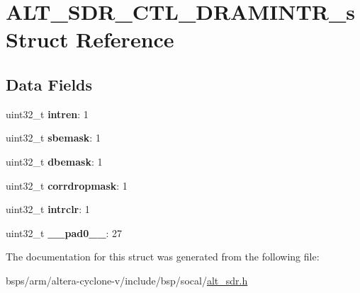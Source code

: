 \hypertarget{structALT__SDR__CTL__DRAMINTR__s}{}\section{A\+L\+T\+\_\+\+S\+D\+R\+\_\+\+C\+T\+L\+\_\+\+D\+R\+A\+M\+I\+N\+T\+R\+\_\+s Struct Reference}
\label{structALT__SDR__CTL__DRAMINTR__s}
\subsection*{Data Fields}
\begin{DoxyCompactItemize}
\item 
\mbox{\label{structALT__SDR__CTL__DRAMINTR__s_a5802c79577a95e96afcd0773962ae8f9}} 
uint32\+\_\+t {\bfseries intren}\+: 1
\item 
\mbox{\label{structALT__SDR__CTL__DRAMINTR__s_ae0c4eeb94cfe1ebd37df769617f24512}} 
uint32\+\_\+t {\bfseries sbemask}\+: 1
\item 
\mbox{\label{structALT__SDR__CTL__DRAMINTR__s_af0b65ca756de1c2adbde1227d62eedf6}} 
uint32\+\_\+t {\bfseries dbemask}\+: 1
\item 
\mbox{\label{structALT__SDR__CTL__DRAMINTR__s_a5854ffd17939d7f049cfc32215cd6a0e}} 
uint32\+\_\+t {\bfseries corrdropmask}\+: 1
\item 
\mbox{\label{structALT__SDR__CTL__DRAMINTR__s_aef3363c31e368613679245b68378928f}} 
uint32\+\_\+t {\bfseries intrclr}\+: 1
\item 
\mbox{\label{structALT__SDR__CTL__DRAMINTR__s_a624ad01d6a347373798aee88641cc4c4}} 
uint32\+\_\+t {\bfseries \+\_\+\+\_\+pad0\+\_\+\+\_\+}\+: 27
\end{DoxyCompactItemize}


The documentation for this struct was generated from the following file\+:\begin{DoxyCompactItemize}
\item 
bsps/arm/altera-\/cyclone-\/v/include/bsp/socal/\mbox{\hyperlink{alt__sdr_8h}{alt\+\_\+sdr.\+h}}\end{DoxyCompactItemize}
